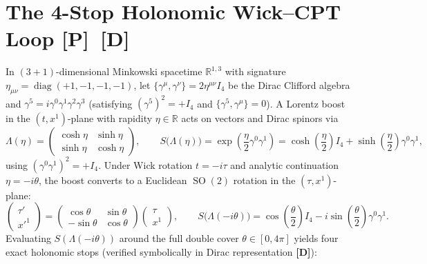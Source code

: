 \documentclass[11pt,a4paper]{article}
\newcommand{\badgeP}{\textbf{\color{sqJade}[P]}}
\newcommand{\badgeD}{\textbf{\color{sqRose}[D]}}
\theoremstyle{definition}
\begin{document}
\section{The 4-Stop Holonomic Wick--CPT Loop \badgeP\ \badgeD}

In $(3+1)$-dimensional Minkowski spacetime $\mathbb{R}^{1,3}$ with signature $\eta_{\mu\nu} = \operatorname{diag}(+1,-1,-1,-1)$, let $\{\gamma^\mu, \gamma^\nu\} = 2\eta^{\mu\nu} I_4$ be the Dirac Clifford algebra and $\gamma^5 = i\gamma^0\gamma^1\gamma^2\gamma^3$ (satisfying $(\gamma^5)^2 = +I_4$ and $\{\gamma^5,\gamma^\mu\} = 0$). A Lorentz boost in the $(t,x^1)$-plane with rapidity $\eta \in \mathbb{R}$ acts on vectors and Dirac spinors via
\begin{equation}
  \Lambda(\eta) = \begin{pmatrix} \cosh\eta & \sinh\eta \\ \sinh\eta & \cosh\eta \end{pmatrix},
  \qquad
  S\big(\Lambda(\eta)\big) = \exp\!\left(\frac{\eta}{2}\gamma^0\gamma^1\right) = \cosh\!\left(\frac{\eta}{2}\right) I_4 + \sinh\!\left(\frac{\eta}{2}\right)\gamma^0\gamma^1,
\end{equation}
using $(\gamma^0\gamma^1)^2 = +I_4$. Under Wick rotation $t = -i\tau$ and analytic continuation $\eta = -i\theta$, the boost converts to a Euclidean $\operatorname{SO}(2)$ rotation in the $(\tau, x^1)$-plane:
\begin{equation}
  \begin{pmatrix} \tau' \\ x'^1 \end{pmatrix} = \begin{pmatrix} \cos\theta & \sin\theta \\ -\sin\theta & \cos\theta \end{pmatrix}\begin{pmatrix} \tau \\ x^1 \end{pmatrix},
  \qquad
  S\big(\Lambda(-i\theta)\big) = \cos\!\left(\frac{\theta}{2}\right) I_4 - i\sin\!\left(\frac{\theta}{2}\right)\gamma^0\gamma^1.
\end{equation}
Evaluating $S(\Lambda(-i\theta))$ around the full double cover $\theta \in [0, 4\pi]$ yields four exact holonomic stops (verified symbolically in Dirac representation \badgeD):
\end{document}
